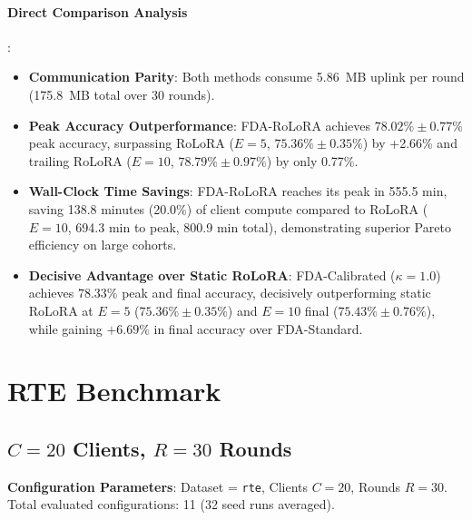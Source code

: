 \documentclass[10pt,a4paper]{article}
\begin{document}
\paragraph{Direct Comparison Analysis}:
\begin{itemize}
    \item \textbf{Communication Parity}: Both methods consume 5.86~MB uplink per round (175.8~MB total over 30 rounds).
    \item \textbf{Peak Accuracy Outperformance}: FDA-RoLoRA achieves $78.02\% \pm 0.77\%$ peak accuracy, surpassing RoLoRA ($E=5$, $75.36\% \pm 0.35\%$) by +2.66\% and trailing RoLoRA ($E=10$, $78.79\% \pm 0.97\%$) by only 0.77\%.
    \item \textbf{Wall-Clock Time Savings}: FDA-RoLoRA reaches its peak in 555.5 min, saving 138.8 minutes (20.0\%) of client compute compared to RoLoRA ($E=10$, 694.3 min to peak, 800.9 min total), demonstrating superior Pareto efficiency on large cohorts.
    \item \textbf{Decisive Advantage over Static RoLoRA}: FDA-Calibrated ($\kappa=1.0$) achieves $78.33\%$ peak and final accuracy, decisively outperforming static RoLoRA at $E=5$ ($75.36\% \pm 0.35\%$) and $E=10$ final ($75.43\% \pm 0.76\%$), while gaining $+6.69\%$ in final accuracy over FDA-Standard.
\end{itemize}



\clearpage
\section{RTE Benchmark}
\label{sec:rte_benchmark}
\subsection{\texorpdfstring{$C=20$ Clients, $R=30$ Rounds}{C=20 Clients, R=30 Rounds}}

\textbf{Configuration Parameters}: Dataset = \texttt{rte}, Clients $C = 20$, Rounds $R = 30$. Total evaluated configurations: 11 (32 seed runs averaged).
\end{document}
